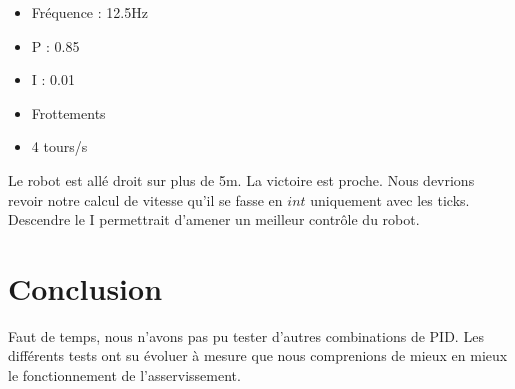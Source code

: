 \documentclass[
	a4paper,									%
	11pt,										%
	twoside,									%
	openright,									%
	notitlepage,									%
	parskip=half,								%
]{scrreprt}										%
\begin{document}
\begin{center}
    
    
    \begin{itemize}
        \item Fréquence : 12.5Hz
        \item P : 0.85
        \item I : 0.01
        \item Frottements
        \item 4 tours/s
    \end{itemize}
    \end{center}

Le robot est allé droit sur plus de 5m. La victoire est proche.
Nous devrions revoir notre calcul de vitesse qu'il se fasse en $int$
uniquement avec les ticks. Descendre le I permettrait d'amener 
un meilleur contrôle du robot. \par


\chapter{Conclusion}

Faut de temps, nous n'avons pas pu tester d'autres combinations de PID. Les différents tests ont 
su évoluer à mesure que nous comprenions de mieux en mieux le fonctionnement de l'asservissement. \par
\end{document}
